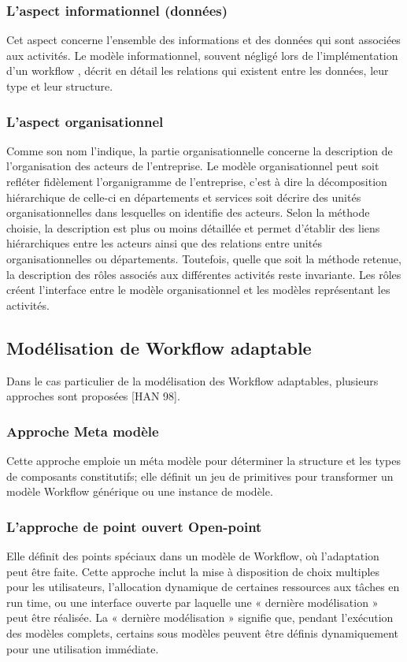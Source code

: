  \subsubsection{ L'aspect informationnel (données) }
 Cet aspect concerne l'ensemble des informations et des données qui sont associées
 aux activités. Le modèle informationnel, souvent négligé lors de l'implémentation d'un workflow \parencite{b3}, décrit en détail les relations qui existent entre les données, leur type et leur structure.
 \subsubsection{L'aspect organisationnel }
 Comme son nom l'indique, la partie organisationnelle concerne la description de l'organisation des acteurs de l'entreprise. Le modèle organisationnel peut soit refléter fidèlement l'organigramme de l'entreprise, c'est à dire la décomposition hiérarchique de celle-ci en départements et services soit décrire des unités organisationnelles dans lesquelles on identifie des acteurs. Selon la méthode choisie, la description est plus ou moins détaillée et permet d'établir des liens hiérarchiques entre les acteurs ainsi que des relations entre unités organisationnelles ou départements. Toutefois, quelle que soit la méthode retenue, la description des rôles associés aux différentes activités reste invariante. Les rôles créent l'interface entre le modèle organisationnel et les modèles représentant les activités.
 
 
 
 \subsection{Modélisation de Workflow adaptable }
 
 Dans le cas particulier de la modélisation des Workflow adaptables, plusieurs approches sont proposées [HAN 98]. 
 
 \subsubsection{ Approche Meta modèle}
 Cette approche emploie un méta modèle pour déterminer la structure et les types de composants constitutifs; elle définit un jeu de primitives pour transformer un modèle Workflow générique ou une instance de modèle. 
 
 \subsubsection{ L’approche de point ouvert Open-point }
 Elle définit des points spéciaux dans un modèle de Workflow, où l’adaptation peut être faite. Cette approche inclut la mise à disposition de choix multiples pour les utilisateurs, l’allocation dynamique de certaines ressources aux tâches en run time, ou une interface ouverte par laquelle une « dernière modélisation » peut être réalisée. La « dernière modélisation » signifie que, pendant l’exécution des modèles complets, certains sous modèles peuvent être définis dynamiquement pour une utilisation immédiate. 
